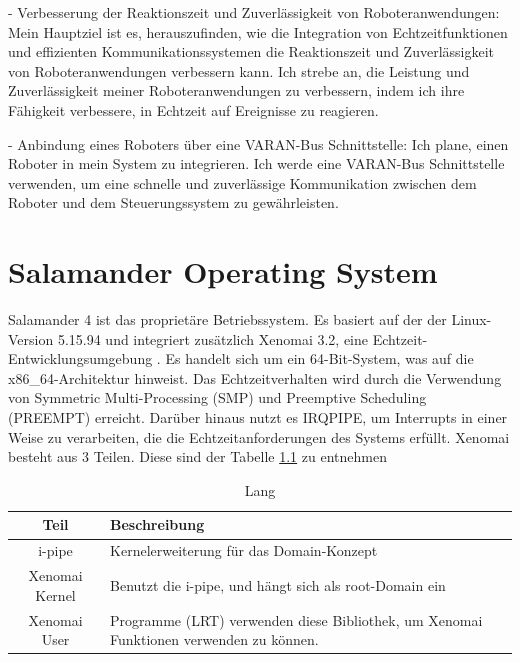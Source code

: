 \documentclass[MMR,Master,english]{twbook}
\begin{document}
- Verbesserung der Reaktionszeit und Zuverlässigkeit von Roboteranwendungen: 
Mein Hauptziel ist es, herauszufinden, wie die Integration von Echtzeitfunktionen und effizienten Kommunikationssystemen die Reaktionszeit und Zuverlässigkeit von Roboteranwendungen verbessern kann. Ich strebe an, die Leistung und Zuverlässigkeit meiner Roboteranwendungen zu verbessern, indem ich ihre Fähigkeit verbessere, in Echtzeit auf Ereignisse zu reagieren.

- Anbindung eines Roboters über eine VARAN-Bus Schnittstelle:
Ich plane, einen Roboter in mein System zu integrieren. Ich werde eine VARAN-Bus Schnittstelle verwenden, um eine schnelle und zuverlässige Kommunikation zwischen dem Roboter und dem Steuerungssystem zu gewährleisten.

\clearpage 
\chapter{Salamander Operating System}
Salamander 4 ist das proprietäre Betriebssystem.
Es basiert auf der der Linux-Version 5.15.94 und integriert zusätzlich Xenomai 3.2, eine Echtzeit-Entwicklungsumgebung \cite{Xenomai}. Es handelt sich um ein 64-Bit-System, was auf die x86\_64-Architektur hinweist. Das Echtzeitverhalten wird durch die Verwendung von Symmetric Multi-Processing (SMP) und Preemptive Scheduling (PREEMPT) erreicht. Darüber hinaus nutzt es IRQPIPE, um Interrupts in einer Weise zu verarbeiten, die die Echtzeitanforderungen des Systems erfüllt. Xenomai besteht aus 3 Teilen. Diese sind der Tabelle \ref{tab:what_is_xenomai} zu entnehmen 

\begin{table}[!h]
    \centering
    \caption[Kurz]{Lang}
    \label{tab:what_is_xenomai}
    \setlength{\tabcolsep}{0.5em} %
    {\renewcommand{\arraystretch}{1.2}%
    \begin{tabular}{|c|p{}|}
        \hline
        \textbf{Teil} & \textbf{Beschreibung} \\ \hline
        i-pipe  & Kernelerweiterung für das Domain-Konzept \\ \hline
        Xenomai Kernel & Benutzt die i-pipe, und hängt sich als root-Domain ein \\ \hline
        Xenomai User &  Programme (LRT) verwenden diese Bibliothek, um Xenomai Funktionen verwenden zu können. \\ \hline
    \end{tabular}}
  \end{table}
  
\end{document}

